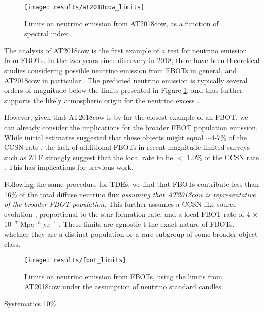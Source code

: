 \begin{figure}[!ht]
	\centering \texttt{[image: results/at2018cow\_limits]}
	\caption{Limits on neutrino emission from AT2018cow, as a function of spectral index.}
	\label{fig:at2018cow_limits}
\end{figure}

The analysis of AT2018cow is the first example of a test for neutrino emission from FBOTs. In the two years since discovery in 2018, there have been theoretical studies considering possible neutrino emission from FBOTs in general, and AT2018cow in particular . The predicted neutrino emission is typically several orders of magnitude below the limits presented in Figure \ref{fig:at2018cow_limits}, and thus further supports the likely atmospheric origin for the neutrino excess \cite{2018ATel11785....1B}.

However, given that AT2018cow is by far the closest example of an FBOT, we can already consider the implications for the broader FBOT population emission. While initial estimates suggested that these objects might equal $\sim$4-7\% of the CCSN rate \cite{drout_fbot, fang_fbot}, the lack of additional FBOTs in recent magnitude-limited surveys such as ZTF strongly suggest that the local rate to be $<$ 1.0\% of the CCSN rate . This has implications for previous work. 

Following the same procedure for TDEs, we find that FBOTs contribute less than 16\% of the total diffuse neutrino flux \emph{assuming that AT2018cow is representative of the broader FBOT population}. This further assumes a CCSN-like source evolution , proportional to the star formation rate, and a local FBOT rate of 4 $\times$ 10$^{-7}$ Mpc$^{-3}$ yr$^{-1}$ \cite{ho_koala}. These limits are agnostic t the exact nature of FBOTs, whether they are a distinct population or a rare subgroup of some broader object class.

\begin{figure}[!ht]
	\centering \texttt{[image: results/fbot\_limits]}
	\caption{Limits on neutrino emission from FBOTs, using the limits from AT2018cow under the assumption of neutrino standard candles.}
	\label{fig:fbot_limits}
\end{figure}

Systematics 10\%